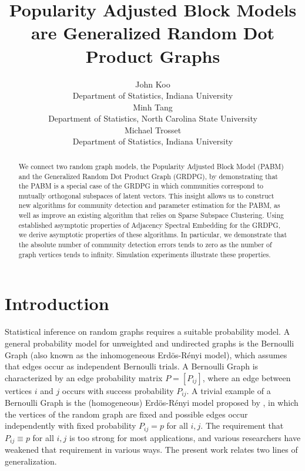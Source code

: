 \documentclass[12pt]{article}
\title{Popularity Adjusted Block Models are Generalized Random Dot Product Graphs}
\author{John Koo\\Department of Statistics, Indiana University\\
Minh Tang\\Department of Statistics, North Carolina State University\\
Michael Trosset\\Department of Statistics, Indiana University}
\date{}
\def\spacingset#1{\renewcommand{\baselinestretch}%
{#1}\small\normalsize} \spacingset{1}
\providecommand{\tightlist}{%
  \setlength{\itemsep}{0pt}\setlength{\parskip}{0pt}}
\begin{document}
\maketitle

\begin{abstract}
We connect two random graph models, the Popularity Adjusted Block Model
(PABM) and the Generalized Random Dot Product Graph (GRDPG),
by demonstrating that the PABM is a special case of 
the GRDPG in which communities correspond to 
mutually orthogonal subspaces of latent vectors. 
This insight allows us to construct new algorithms for community detection
and parameter estimation for the PABM, 
as well as improve an existing algorithm 
that relies on Sparse Subspace Clustering. 
Using established asymptotic properties of 
Adjacency Spectral Embedding for the GRDPG, 
we derive asymptotic properties of these algorithms. 
In particular, we demonstrate that the absolute number of 
community detection errors tends to zero as 
the number of graph vertices tends to infinity. 
Simulation experiments illustrate these properties. 
\end{abstract}

\providecommand{\tightlist}{%
  \setlength{\itemsep}{0pt}\setlength{\parskip}{0pt}}
\newcommand{\diag}{\mathrm{diag}}
\newcommand{\tr}{\mathrm{Tr}}
\newcommand{\blockdiag}{\mathrm{blockdiag}}
\newcommand{\indep}{\stackrel{\mathrm{ind}}{\sim}}
\newcommand{\iid}{\stackrel{\mathrm{iid}}{\sim}}
\newcommand{\Bernoulli}{\mathrm{Bernoulli}}
\newcommand{\Betadist}{\mathrm{Beta}}
\newcommand{\BG}{\mathrm{BernoulliGraph}}
\newcommand{\PABM}{\mathrm{PABM}}
\newcommand{\RDPG}{\mathrm{RDPG}}
\newcommand{\GRDPG}{\mathrm{GRDPG}}
\newcommand{\Multinomial}{\mathrm{Multinomial}}
\newtheorem{theorem}{Theorem}
\newtheorem{lemma}{Lemma}
\newtheorem{proposition}{Proposition}
\theoremstyle{remark}
\newtheorem{remark}{Remark}
\theoremstyle{definition}
\newtheorem{definition}{Definition}
\newtheorem{example}{Example}
\newpage
\spacingset{1.5} %

\hypertarget{introduction}{%
\section{Introduction}\label{introduction}}

Statistical inference on random graphs requires a suitable probability
model.  A general probability model for unweighted and undirected
graphs is the Bernoulli Graph (also known as the inhomogeneous
Erd\"{o}s-R\'{e}nyi model), which assumes that edges occur as
independent Bernoulli trials.  A Bernoulli Graph is characterized by
an edge probability matrix $P=[P_{ij}]$, where an edge between
vertices $i$ and $j$ occurs with success probability $P_{ij}$.  A
trivial example of a Bernoulli Graph is the (homogeneous)
Erd\"{o}s-R\'{e}nyi model proposed by \citet{Gilbert:1959}, in which
the vertices of the random graph are fixed and possible edges occur
independently with fixed probability $P_{ij} = p$ for all $i,j$.  The requirement that
$P_{ij} \equiv p$ for all $i,j$ is too strong for most applications, and various
researchers have weakened that requirement in various ways.  The
present work relates two lines of generalization.
\end{document}
